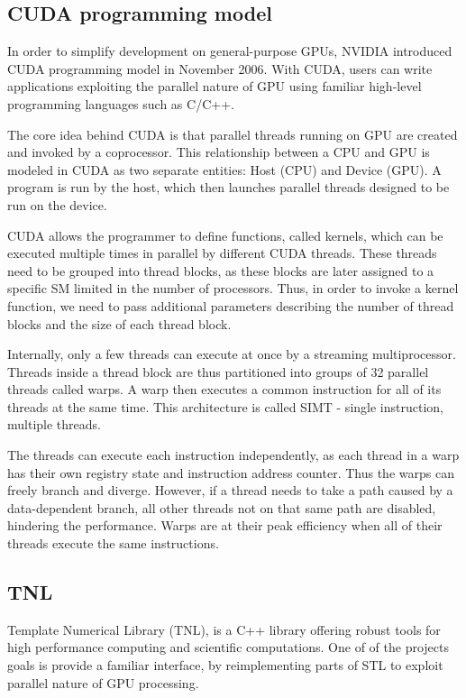 \documentclass{article}
\begin{document}
\subsection{CUDA programming model}
In order to simplify development on general-purpose GPUs, NVIDIA introduced CUDA programming model in November 2006. With CUDA, users can write applications exploiting the parallel nature of GPU using familiar high-level programming languages such as C/C++.

The core idea behind CUDA is that parallel threads running on GPU are created and invoked by a coprocessor. This relationship between a CPU and GPU is modeled in CUDA as two separate entities: Host (CPU) and Device (GPU). A program is run by the host, which then launches parallel threads designed to be run on the device.

CUDA allows the programmer to define functions, called kernels, which can be executed multiple times in parallel by different CUDA threads. These threads need to be grouped into thread blocks, as these blocks are later assigned to a specific SM limited in the number of processors. Thus, in order to invoke a kernel function, we need to pass additional parameters describing the number of thread blocks and the size of each thread block.

Internally, only a few threads can execute at once by a streaming multiprocessor. Threads inside a thread block are thus partitioned into groups of 32 parallel threads called warps. A warp then executes a common instruction for all of its threads at the same time. This architecture is called SIMT - single instruction, multiple threads.

The threads can execute each instruction independently, as each thread in a warp has their own registry state and instruction address counter. Thus the warps can freely branch and diverge. However, if a thread needs to take a path caused by a data-dependent branch, all other threads not on that same path are disabled, hindering the performance. Warps are at their peak efficiency when all of their threads execute the same instructions.

\subsection{TNL}

Template Numerical Library (TNL), is a C++ library offering robust tools for high performance computing and scientific computations. One of of the projects goals is provide a familiar interface, by reimplementing parts of STL to exploit parallel nature of GPU processing.
\end{document}
